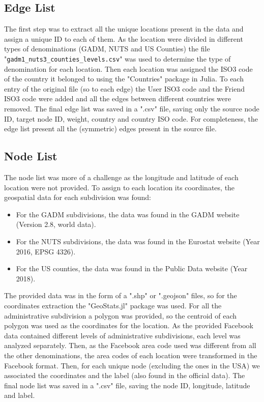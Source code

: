 \subsection{Edge List}
The first step was to extract all the unique locations present in the data and assign a unique ID to each of them. As the location were divided in different types of denominations (GADM\cite{GADM}, NUTS\cite{NUTS} and US Counties) the file "\texttt{gadm1\_nuts3\_counties\_levels.csv}" was used to determine the type of denomination for each location.
Then each location was assigned the ISO3 code of the country it belonged to using the "Countries" package in Julia\cite{countries_package}.
To each entry of the original file (so to each edge) the User ISO3 code and the Friend ISO3 code were added and all the edges between different countries were removed.
The final edge list was saved in a ".csv" file, saving only the source node ID, target node ID, weight, country and country ISO code.
For completeness, the edge list present all the (symmetric) edges present in the source file.

\subsection{Node List}
The node list was more of a challenge as the longitude and latitude of each location were not provided.
To assign to each location its coordinates, the geospatial data for each subdivision was found:
\begin{itemize}
    \item For the GADM subdivisions, the data was found in the GADM website\cite{GADM} (Version 2.8, world data).
    \item For the NUTS subdivisions, the data was found in the Eurostat website\cite{NUTS} (Year 2016, EPSG 4326).
    \item For the US counties, the data was found in the Public Data website\cite{USCounties} (Year 2018).
\end{itemize}
The provided data was in the form of a ".shp" or ".geojson" files, so for the coordinates extraction the "GeoStats.jl" package was used\cite{geostats_package}. For all the administrative subdivision a polygon was provided, so the centroid of each polygon was used as the coordinates for the location. As the provided Facebook data contained different levels of administrative subdivisions, each level was analyzed separately.
Then, as the Facebook area code used was different from all the other denominations, the area codes of each location were transformed in the Facebook format.
Then, for each unique node (excluding the ones in the USA) we associated the coordinates and the label (also found in the official data).
The final node list was saved in a ".csv" file, saving the node ID, longitude, latitude and label.

